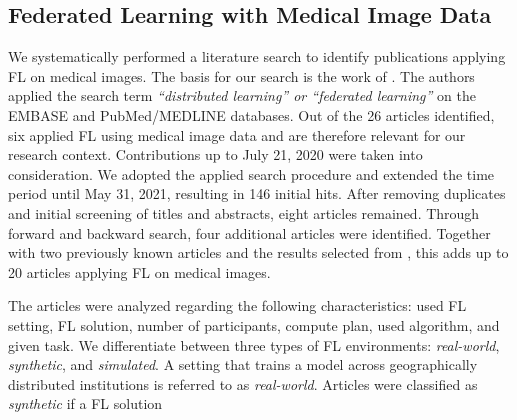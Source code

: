 \subsection{Federated Learning with Medical Image Data}
\label{subsec:LitRev}

We systematically performed a literature search to identify publications applying FL on medical images. The basis for our search is the work of \cite{Kirienko2021DistributedAI}. The authors applied the search term \textit{``distributed learning'' or ``federated learning''} on the EMBASE and PubMed/MEDLINE databases. Out of the 26 articles identified, six applied FL using medical image data and are therefore relevant for our research context. Contributions up to July 21, 2020 were taken into consideration. We adopted the applied search procedure and extended the time period until May 31, 2021, resulting in 146 initial hits. After removing duplicates and initial screening of titles and abstracts, eight articles remained. Through forward and backward search, four additional articles were identified. Together with two previously known articles \citep{Wang2020AutomatedLearning, Roth2020FederatedImplementation} and the results selected from \cite{Kirienko2021DistributedAI}, this adds up to 20 articles applying FL on medical images.

The articles were analyzed regarding the following characteristics: used FL setting, FL solution, number of participants, compute plan, used algorithm, and given task. We differentiate between three types of FL environments: \textit{real-world}, \textit{synthetic}, and \textit{simulated}.
A setting that trains a model across geographically distributed institutions is referred to as \textit{real-world}.
Articles were classified as \textit{synthetic} if a FL solution


